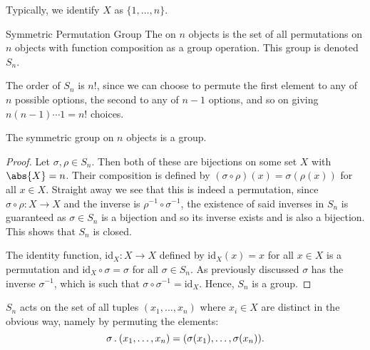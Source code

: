 Typically, we identify \(X\) as \(\{1, \dotsc, n\}\).

\begin{dfn}{Symmetric Permutation Group}{}
    The  on \(n\) objects is the set of all permutations on \(n\) objects with function composition as a group operation.
    This group is denoted \(S_n\).
\end{dfn}

The order of \(S_n\) is \(n!\), since we can choose to permute the first element to any of \(n\) possible options, the second to any of \(n - 1\) options, and so on giving \(n(n - 1) \dotsm 1 = n!\) choices.

\begin{lma}{}{}
    The symmetric group on \(n\) objects is a group.
    \begin{proof}
        Let \(\sigma, \rho \in S_n\).
        Then both of these are bijections on some set \(X\) with \(\abs{X} = n\).
        Their composition is defined by \((\sigma \circ \rho)(x) = \sigma(\rho(x))\) for all \(x \in X\).
        Straight away we see that this is indeed a permutation, since \(\sigma \circ \rho \colon X \to X\) and the inverse is \(\rho^{-1} \circ \sigma^{-1}\), the existence of said inverses in \(S_n\) is guaranteed as \(\sigma \in S_n\) is a bijection and so its inverse exists and is also a bijection.
        This shows that \(S_n\) is closed.
        
        The identity function, \(\mathrm{id}_X \colon X \to X\) defined by \(\mathrm{id}_X(x) = x\) for all \(x \in X\) is a permutation and \(\mathrm{id}_X \circ \sigma = \sigma\) for all \(\sigma \in S_n\).
        As previously discussed \(\sigma\) has the inverse \(\sigma^{-1}\), which is such that \(\sigma\circ \sigma^{-1} = \mathrm{id}_X\).
        Hence, \(S_n\) is a group.
    \end{proof}
\end{lma}

\(S_n\) acts on the set of all tuples \((x_1, \dotsc, x_n)\) where \(x_i \in X\) are distinct in the obvious way, namely by permuting the elements:
\begin{equation}
    \sigma \mathbin{.} (x_1, \dotsc, x_n) = (\sigma(x_1), \dotsc, \sigma(x_n)).
\end{equation}

